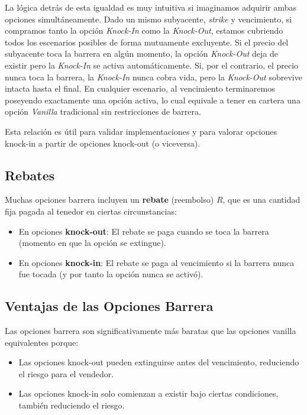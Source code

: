 La lógica detrás de esta igualdad es muy intuitiva si imaginamos adquirir ambas opciones simultáneamente. Dado un mismo subyacente, \textit{strike} y vencimiento, si compramos tanto la opción \textit{Knock-In} como la \textit{Knock-Out}, estamos cubriendo todos los escenarios posibles de forma mutuamente excluyente. Si el precio del subyacente toca la barrera en algún momento, la opción \textit{Knock-Out} deja de existir pero la \textit{Knock-In} se activa automáticamente. Si, por el contrario, el precio nunca toca la barrera, la \textit{Knock-In} nunca cobra vida, pero la \textit{Knock-Out} sobrevive intacta hasta el final. En cualquier escenario, al vencimiento terminaremos poseyendo exactamente una opción activa, lo cual equivale a tener en cartera una opción \textit{Vanilla} tradicional sin restricciones de barrera.

Esta relación es útil para validar implementaciones y para valorar opciones knock-in a partir de opciones knock-out (o viceversa).

\subsection{Rebates}

Muchas opciones barrera incluyen un \textbf{rebate} (reembolso) $R$, que es una cantidad fija pagada al tenedor en ciertas circunstancias:

\begin{itemize}
    \item En opciones \textbf{knock-out}: El rebate se paga cuando se toca la barrera (momento en que la opción se extingue).
    \item En opciones \textbf{knock-in}: El rebate se paga al vencimiento si la barrera nunca fue tocada (y por tanto la opción nunca se activó).
\end{itemize}

\subsection{Ventajas de las Opciones Barrera}

Las opciones barrera son significativamente más baratas que las opciones vanilla equivalentes porque:

\begin{itemize}
    \item Las opciones knock-out pueden extinguirse antes del vencimiento, reduciendo el riesgo para el vendedor.
    \item Las opciones knock-in solo comienzan a existir bajo ciertas condiciones, también reduciendo el riesgo.
\end{itemize}

